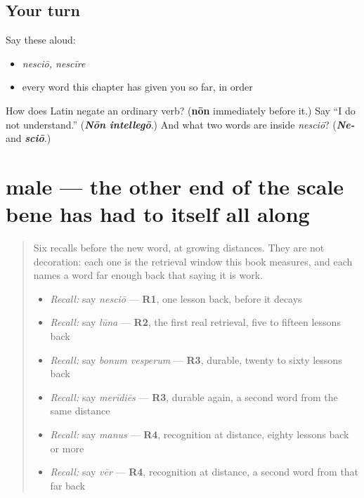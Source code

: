 \subsection*{Your turn}
Say these aloud:

\begin{itemize}
\raggedright
  \item \emph{nesciō, nescīre}
  \item every word this chapter has given you so far, in order
\end{itemize}

\begin{tcolorbox}[breakable,colback=teal!4,colframe=teal!35!black,title={Before you move on}]
How does Latin negate an ordinary verb? (\textbf{nōn} immediately before it.) Say \textquotedblleft{}I do not understand.\textquotedblright{} (\emph{\textbf{Nōn intellegō}}.) And what two words are inside \emph{nesciō}? (\emph{\textbf{Ne-}} and \emph{\textbf{sciō}}.)
\end{tcolorbox}
\section[male]{male — the other end of the scale bene has had to itself all along}

\label{lesson:LA-C48-male}



\begin{quote}
Six recalls before the new word, at growing distances. They are not decoration: each one is the retrieval window this book measures, and each names a word far enough back that saying it is work.

\begin{itemize}
\raggedright
  \item \emph{Recall:} say \emph{nesciō} — \textbf{R1}, one lesson back, before it decays
  \item \emph{Recall:} say \emph{lūna} — \textbf{R2}, the first real retrieval, five to fifteen lessons back
  \item \emph{Recall:} say \emph{bonum vesperum} — \textbf{R3}, durable, twenty to sixty lessons back
  \item \emph{Recall:} say \emph{merīdiēs} — \textbf{R3}, durable again, a second word from the same distance
  \item \emph{Recall:} say \emph{manus} — \textbf{R4}, recognition at distance, eighty lessons back or more
  \item \emph{Recall:} say \emph{vēr} — \textbf{R4}, recognition at distance, a second word from that far back
\end{itemize}
\end{quote}

